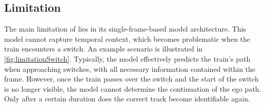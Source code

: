\subsection{Limitation}
\label{sec:limitationBaseline}

The main limitation of \cite{tepNet2024} lies in its single-frame-based model architecture.
This model cannot capture temporal context, which becomes problematic when the train encounters a switch.
An example scenario is illustrated in \autoref{fig:limitationSwitch}.
Typically, the model effectively predicts the train's path when approaching switches, with all necessary information contained within the frame.
However, once the train passes over the switch and the start of the switch is no longer visible, the model cannot determine the continuation of the ego path.
Only after a certain duration does the correct track become identifiable again.

\vspace{1cm}

